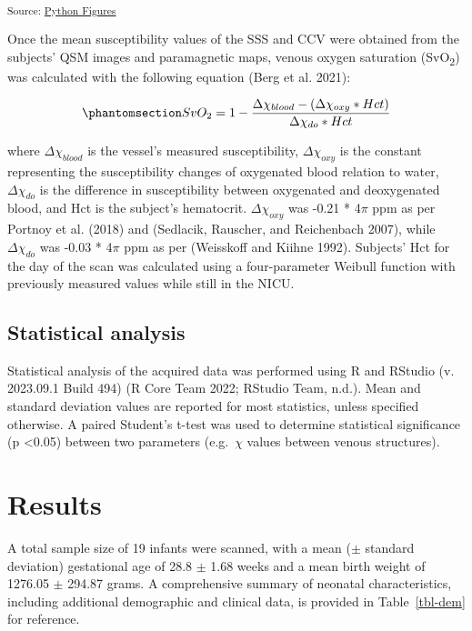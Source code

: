 \documentclass[
sn-nature
]{sn-jnl}
\begin{document}
\textsubscript{Source:
\href{https://WeberLab.github.io/Chisep_CSVO2_Manuscript/notebooks/Figures-preview.html\#cell-fig-sample}{Python
Figures}}

Once the mean susceptibility values of the SSS and CCV were obtained
from the subjects' QSM images and paramagnetic maps, venous oxygen
saturation (SvO\textsubscript{2}) was calculated with the following
equation (Berg et al. 2021):

\begin{equation}\phantomsection\label{eq-svo}{
SvO_{2} = 1 - \frac{\Delta \chi _{blood} - (\Delta \chi _{oxy} * Hct)}{\Delta \chi _{do} * Hct}
}\end{equation}

where \(\Delta \chi _{blood}\) is the vessel's measured susceptibility,
\(\Delta \chi _{oxy}\) is the constant representing the susceptibility
changes of oxygenated blood relation to water, \(\Delta \chi _{do}\) is
the difference in susceptibility between oxygenated and deoxygenated
blood, and Hct is the subject's hematocrit. \(\Delta \chi _{oxy}\) was
-0.21 * 4\(\pi\) ppm as per Portnoy et al. (2018) and (Sedlacik,
Rauscher, and Reichenbach 2007), while \(\Delta \chi _{do}\) was -0.03 *
4\(\pi\) ppm as per (Weisskoff and Kiihne 1992). Subjects' Hct for the
day of the scan was calculated using a four-parameter Weibull function
with previously measured values while still in the NICU.

\subsection{Statistical analysis}\label{statistical-analysis}

Statistical analysis of the acquired data was performed using R and
RStudio (v. 2023.09.1 Build 494) (R Core Team 2022; RStudio Team, n.d.).
Mean and standard deviation values are reported for most statistics,
unless specified otherwise. A paired Student's t-test was used to
determine statistical significance (p \textless0.05) between two
parameters (e.g.~\(\chi\) values between venous structures).

\section{Results}\label{sec-results}

A total sample size of 19 infants were scanned, with a mean (\(\pm\)
standard deviation) gestational age of 28.8 \(\pm\) 1.68 weeks and a
mean birth weight of 1276.05 \(\pm\) 294.87 grams. A comprehensive
summary of neonatal characteristics, including additional demographic
and clinical data, is provided in Table~\ref{tbl-dem} for reference.
\end{document}
